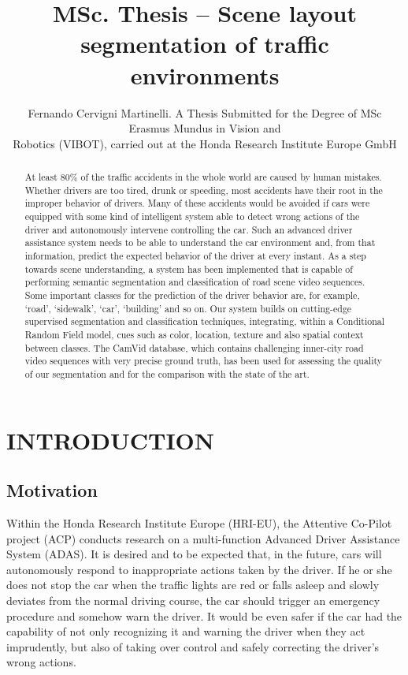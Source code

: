 \documentclass[a4paper, 10pt, conference]{ieeeconf}      %
\title{\LARGE \bf
MSc. Thesis -- Scene layout segmentation of traffic environments
}
\author{Fernando Cervigni Martinelli. A Thesis Submitted for the Degree of MSc Erasmus Mundus
in Vision and\\ Robotics (VIBOT), carried out at the Honda Research Institute Europe GmbH%
}
\begin{document}
\maketitle
\thispagestyle{empty}
\pagestyle{empty}


\begin{abstract}

At least 80\% of the traffic accidents in the whole world are caused by human mistakes. Whether drivers are too tired, drunk or speeding, most accidents have their root in the improper behavior of drivers. Many of these accidents would be avoided if cars were equipped with some kind of intelligent system able to detect wrong actions of the driver and autonomously intervene controlling the car. Such an advanced driver assistance system needs to be able to understand the car environment and, from that information, predict the expected behavior of the driver at every instant. As a step towards scene understanding, a system has been implemented that is capable of performing semantic segmentation and classification of road scene video sequences. Some important classes for the prediction of the driver behavior are, for example, `road', `sidewalk', `car', `building' and so on. Our system builds on cutting-edge supervised segmentation and classification techniques, integrating, within a Conditional Random Field model, cues such as color, location, texture and also spatial context between classes. The CamVid database, which contains challenging inner-city road video sequences with very precise ground truth, has been used for assessing the quality of our segmentation and for the comparison with the state of the art.

\end{abstract}


\section{INTRODUCTION}

\subsection{Motivation}

Within the Honda Research Institute Europe (HRI-EU), the Attentive Co-Pilot project (ACP) conducts research on a multi-function Advanced Driver Assistance System (ADAS). It is desired and to be expected that, in the future, cars will autonomously respond to inappropriate actions taken by the driver. If he or she does not stop the car when the traffic lights are red or falls asleep and slowly deviates from the normal driving course, the car should trigger an emergency procedure and somehow warn the driver. It would be even safer if the car had the capability of not only recognizing it and warning the driver when they act imprudently, but also of taking over control and safely correcting the driver's wrong actions.
\end{document}
